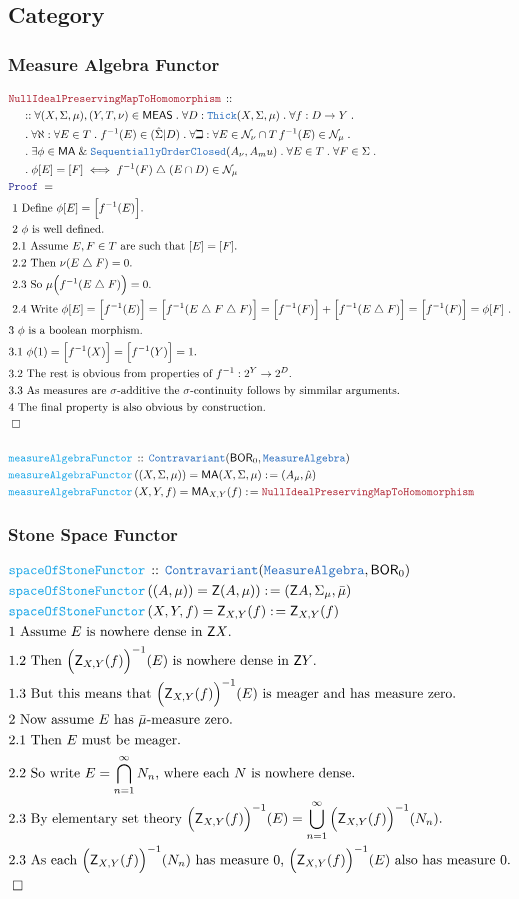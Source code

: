 \documentclass[12pt]{scrartcl}
\newcommand{\TYPE}[1]{\textcolor{NavyBlue}{\mathtt{#1}}}
\newcommand{\FUNC}[1]{\textcolor{Cerulean}{\mathtt{#1}}}
\newcommand{\LOGIC}[1]{\textcolor{Blue}{\mathtt{#1}}}
\newcommand{\THM}[1]{\textcolor{Maroon}{\mathtt{#1}}}
\renewcommand{\.}{\; . \;}
\newcommand{\de}{: \kern 0.1pc =}
\newcommand{\Act}[1]{\left( #1 \right)}
\newcommand{\Theorem}[2]{& \THM{#1} \, :: \, #2 \\ & \Proof = \\ }
\newcommand{\DeclareFunc}[2]{& \FUNC{#1} \, :: \, #2 \\}
\newcommand{\DefineNamedFunc}[4]{&  \FUNC{#1}\Act{#2} = #3 \de #4 \\}
\newcommand{\NewLine}{\\ & \kern 1pc}
\newcommand{\Page}[1]{ \begin{align*} #1 \end{align*}   }
\renewcommand{\And}{\; \& \;}
\newcommand{\du}{\; \triangle \;}
\newcommand{\QED}{\; \square}
\newcommand{\EndProof}{& \QED \\}
\newcommand{\Proof}{\LOGIC{Proof} \; }
\newcommand{\Explain}[1]{& \text{#1.} \\}
\newcommand{\Contra}{\TYPE{Contravariant}}
\newcommand{\SOC}{\TYPE{SequentiallyOrderClosed}}
\newcommand{\Z}{\mathsf{Z}}
\newcommand{\BOR}{\mathsf{BOR}}
\newcommand{\Null}{\mathcal{N}}
\newcommand{\Thick}{\TYPE{Thick}}
\newcommand{\MEAS}{\mathsf{MEAS}}
\newcommand{\MA}{\TYPE{MeasureAlgebra}}
\newcommand{\ma}{\mathsf{MA}}
\begin{document}
\subsection{Category}
\subsubsection{Measure Algebra Functor}
\Page{
	\Theorem{NullIdealPreservingMapToHomomorphism}
	{
		\NewLine ::		
		\forall (X,\Sigma,\mu), (Y,T,\nu) \in \MEAS \.
		\forall D : \Thick(X,\Sigma,\mu) \. 
		\forall f : D \to Y \. \NewLine \.
		\forall \aleph : \forall E \in T \.  f^{-1}(E) \in (\hat \Sigma | D) \.  
		\forall \beth :  \forall E \in \Null_\nu \cap T \, f^{-1}(E) \in \Null_\mu \. \NewLine \.
		\exists \phi \in \ma \And \SOC(A_\nu,A_mu) \. 
		\forall E \in  T \. \forall F \in \Sigma  \.    \NewLine \.
		\phi[E] = [F] \iff   f^{-1}(F) \du (E \cap D) \in \Null_\mu 
	}
	\Explain{ 1  Define $\phi[E] = \Big[f^{-1}(E)\Big]$}
	\Explain{ 2  $\phi$ is well defined}
	\Explain{ 2.1 Assume $E,F \in T$ are such that $[E] = [F]$}
	\Explain{ 2.2 Then $\nu(E \du F) = 0$}
	\Explain{ 2.3 So $\mu\Big( f^{-1}(E \du F) \Big) = 0$}
	\Explain{ 2.4 Write 
		$\phi[E] = \Big[f^{-1}(E)\Big] = \Big[f^{-1}(E \du F \du F)\Big] = 
		\Big[f^{-1}(F)\Big] + \Big[ f^{-1}(E \du F)\Big] = 
		\Big[f^{-1}(F)\Big] = \phi[F]$ 
	}
	\Explain{3 $\phi$ is a boolean morphism}
	\Explain{3.1 $\phi(1) = \Big[ f^{-1}(X)\Big] = \Big[ f^{-1}(Y)\Big] = 1$}
	\Explain{3.2 The rest is obvious from properties of $f^{-1}:2^Y \to 2^D$}
	\Explain{3.3 As measures are $\sigma$-additive the $\sigma$-continuity follows by simmilar arguments}
	\Explain{4 The final property is also obvious by construction}
	\EndProof
	\\	
	\DeclareFunc{measureAlgebraFunctor}
	{
		\Contra(\BOR_0,\MA)
	}
	\DefineNamedFunc{measureAlgebraFunctor}{(X,\Sigma,\mu)}
	{\ma(X,\Sigma,\mu)}{(A_\mu,\hat\mu)}
	\DefineNamedFunc{measureAlgebraFunctor}{X,Y,f}
	{\ma_{X,Y}(f)}{\THM{NullIdealPreservingMapToHomomorphism}}
}
\newpage
\subsubsection{Stone Space Functor}
\Page{
	\DeclareFunc{spaceOfStoneFunctor}
	{
		\Contra(\MA, \BOR_0)
	}
	\DefineNamedFunc{spaceOfStoneFunctor}{(A,\mu)}
	{\Z(A,\mu))}{(\Z A, \Sigma_\mu, \bar \mu)}
	\DefineNamedFunc{spaceOfStoneFunctor}{X,Y,f}
	{\Z_{X,Y}(f)}{\Z_{X,Y}(f)}
	\Explain{1 Assume $E$ is  nowhere dense in $\Z X$}
	\Explain{1.2 Then $\Big(\Z_{X,Y}(f)\Big)^{-1}(E)$ is nowhere dense in $\Z Y$}
	\Explain{1.3 But this means that $\Big(\Z_{X,Y}(f)\Big)^{-1}(E)$ is meager and has measure zero}
	\Explain{2 Now assume $E$ has $\bar \mu$-measure zero}
	\Explain{2.1 Then $E$ must be meager}
	\Explain{2.2 So write $E = \bigcap^\infty_{n=1} N_n$, where each $N$ is nowhere dense}
	\Explain{2.3 By elementary set theory 
		$\Big(\Z_{X,Y}(f)\Big)^{-1}(E) = \bigcup^\infty_{n=1}\Big(\Z_{X,Y}(f)\Big)^{-1}(N_n)$}
	\Explain{2.3 As each $\Big(\Z_{X,Y}(f)\Big)^{-1}(N_n)$ has measure $0$, 
		$\Big(\Z_{X,Y}(f)\Big)^{-1}(E)$ also has measure $0$}
	\EndProof
}
\newpage
\end{document}
